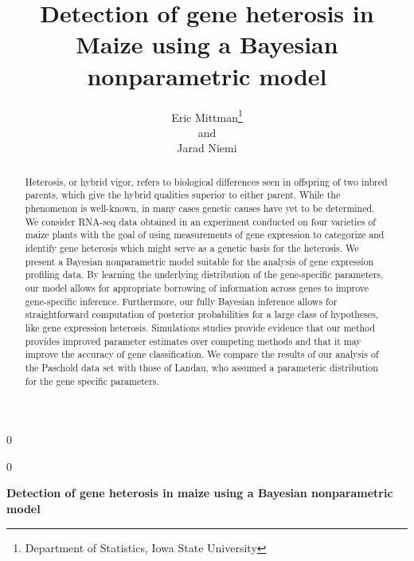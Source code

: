 \documentclass[12pt]{article}
\newcommand{\blind}{0}
\begin{document}
\newtoggle{thesis}
\toggletrue{thesis}
% 

\def\spacingset#1{\renewcommand{\baselinestretch}%
{#1}\small\normalsize} \spacingset{1}


\blind
{
  \title{\bf Detection of gene heterosis in Maize using a Bayesian nonparametric model}
  \author{Eric Mittman\thanks{Department of Statistics, Iowa State University}\\
    and\\
    Jarad Niemi\footnotemark[1]}
  \maketitle
} \fi

\blind
{
  \bigskip
  \bigskip
  \bigskip
  \begin{center}
    {\LARGE\bf Detection of gene heterosis in maize using a Bayesian nonparametric model}
\end{center}
  \medskip
} \fi

\bigskip
\begin{abstract}
Heterosis, or hybrid vigor, refers to biological differences seen in offspring of two inbred parents, which give the hybrid qualities superior to either parent. While the phenomenon is well-known, in many cases genetic causes have yet to be determined. We consider RNA-seq data obtained in an experiment conducted on four varieties of maize plants with the goal of using measurements of gene expression to categorize and identify gene heterosis which might serve as a genetic basis for the heterosis. We present a Bayesian nonparametric model suitable for the analysis of gene expression profiling data. By learning the underlying distribution of the gene-specific parameters, our model allows for appropriate borrowing of information across genes to improve gene-specific inference. Furthermore, our fully Bayesian inference allows for straightforward computation of posterior probabilities for a large class of hypotheses, like gene expression heterosis. Simulations studies provide evidence that our method provides improved parameter estimates over competing methods and that it may improve the accuracy of gene classification. We compare the results of our analysis of the Paschold data set with those of Landau, who assumed a parameteric distribution for the gene specific parameters.

\end{abstract}
\end{document}

